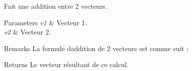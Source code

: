 Fait une addition entre 2 vecteurs.


\begin{DoxyParams}{Parameters}
{\em v1} & Vecteur 1. \\
\hline
{\em v2} & Vecteur 2. \\
\hline
\end{DoxyParams}
\begin{DoxyRemark}{Remarks}
La formule d\textquotesingle{}addition de 2 vecteurs est comme suit \+:~\newline
   
\end{DoxyRemark}
\begin{DoxyReturn}{Returns}
Le vecteur résultant de ce calcul. 
\end{DoxyReturn}
